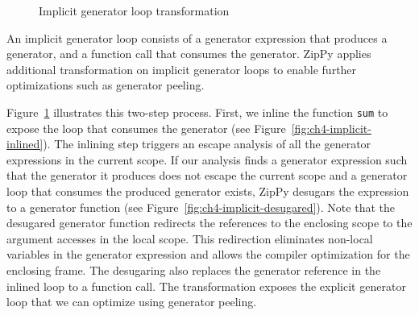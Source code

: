 \begin{figure}[th]
\centering
{}


\caption{Implicit generator loop transformation}
\label{fig:ch4-implicit-gen-loop}
\end{figure}

An implicit generator loop consists of a generator expression that produces a generator, and a function call that consumes the generator.
ZipPy applies additional transformation on implicit generator loops to enable further optimizations such as generator peeling.

Figure~\ref{fig:ch4-implicit-gen-loop} illustrates this two-step process.
First, we inline the function \texttt{sum} to expose the loop that consumes the generator (see Figure~\ref{fig:ch4-implicit-inlined}).
The inlining step triggers an escape analysis of all the generator expressions in the current scope.
If our analysis finds a generator expression such that the generator it produces does not escape the current scope and
a generator loop that consumes the produced generator exists, ZipPy desugars the expression to a generator function (see Figure~\ref{fig:ch4-implicit-desugared}).
Note that the desugared generator function redirects the references to the enclosing scope to the argument accesses in the local scope.
This redirection eliminates non-local variables in the generator expression and allows the compiler optimization for the enclosing frame.
The desugaring also replaces the generator reference in the inlined loop to a function call.
The transformation exposes the explicit generator loop that we can optimize using generator peeling.

